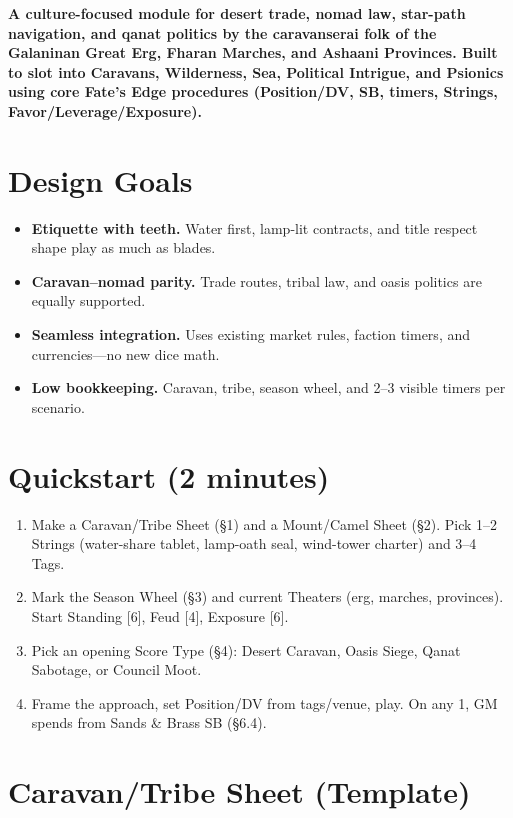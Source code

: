 \documentclass[11pt]{article}
\begin{document}




\begin{center}
\textbf{A culture-focused module for desert trade, nomad law, star-path navigation, and qanat politics by the caravanserai folk of the Galaninan Great Erg, Fharan Marches, and Ashaani Provinces. Built to slot into Caravans, Wilderness, Sea, Political Intrigue, and Psionics using core Fate's Edge procedures (Position/DV, SB, timers, Strings, Favor/Leverage/Exposure).}
\end{center}

\section*{Design Goals}
\begin{itemize}
\item \textbf{Etiquette with teeth.} Water first, lamp-lit contracts, and title respect shape play as much as blades.
\item \textbf{Caravan--nomad parity.} Trade routes, tribal law, and oasis politics are equally supported.
\item \textbf{Seamless integration.} Uses existing market rules, faction timers, and currencies---no new dice math.
\item \textbf{Low bookkeeping.} Caravan, tribe, season wheel, and 2--3 visible timers per scenario.
\end{itemize}

\section*{Quickstart (2 minutes)}
\begin{enumerate}
\item Make a Caravan/Tribe Sheet (\S1) and a Mount/Camel Sheet (\S2). Pick 1--2 Strings (water-share tablet, lamp-oath seal, wind-tower charter) and 3--4 Tags.
\item Mark the Season Wheel (\S3) and current Theaters (erg, marches, provinces). Start Standing [6], Feud [4], Exposure [6].
\item Pick an opening Score Type (\S4): Desert Caravan, Oasis Siege, Qanat Sabotage, or Council Moot.
\item Frame the approach, set Position/DV from tags/venue, play. On any 1, GM spends from Sands \& Brass SB (\S6.4).
\end{enumerate}


\section{Caravan/Tribe Sheet (Template)}
\end{document}
